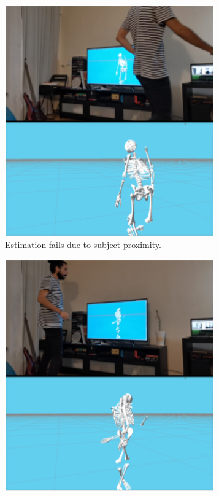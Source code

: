 \begin{figure}[h]\centering
    \begin{subfigure}{0.49\textwidth}\centering
        \includegraphics[width=0.99\textwidth]{figures/too_close.png} 
        \caption{Estimation fails due to subject proximity.}
        \label{subfig:too_close}
    \end{subfigure}
    \begin{subfigure}{0.49\textwidth}\centering
        \includegraphics[width=0.99\textwidth]{figures/occlusion.png}

\end{subfigure}
\end{figure}
